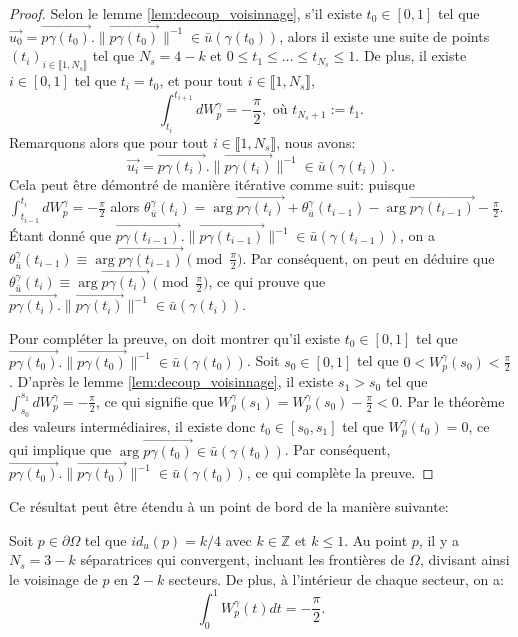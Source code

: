 \begin{proof}
Selon le lemme \ref{lem:decoup_voisinnage}, s'il existe $t_0\in[0, 1]$ tel que $\overrightarrow{u_0}=\overrightarrow{p\gamma(t_0)}.\|\overrightarrow{p\gamma(t_0)}\|^{-1}\in\bar{u}(\gamma(t_0))$, alors il existe une suite de points $(t_i)_{i\in\llbracket1, N_s\rrbracket}$ tel que $N_s=4-k$ et $0\leq t_1\leq\dots\leq t_{N_s}\leq 1$. De plus, il existe $i\in [0, 1]$ tel que $t_i=t_0$, et pour tout $i\in\llbracket 1, N_s\rrbracket$,
$$\int_{t_i}^{t_{i+1}}dW_p^\gamma=-\frac{\pi}{2},\mbox{ où }t_{N_s+1}:=t_1.$$
Remarquons alors que pour tout $i\in\llbracket 1, N_s\rrbracket$, nous avons:$$\overrightarrow{u_i}=\overrightarrow{p\gamma(t_i)}.\|\overrightarrow{p\gamma(t_i)}\|^{-1}\in\bar{u}(\gamma(t_i)).$$
Cela peut être démontré de manière itérative comme suit: puisque $\int_{t_{i-1}}^{t_{i}}dW_p^\gamma=-\frac{\pi}{2}$ alors $\theta^\gamma_{\bar{u}}(t_i)=\arg \overrightarrow{p\gamma(t_i)} +\theta^\gamma_{\bar{u}}(t_{i-1})-\arg \overrightarrow{p\gamma(t_{i-1})}-\frac{\pi}{2}$. Étant donné que $\overrightarrow{p\gamma(t_{i-1})}.\|\overrightarrow{p\gamma(t_{i-1})}\|^{-1}\in\bar{u}(\gamma(t_{i-1}))$, on a $\theta^\gamma_{\bar{u}}(t_{i-1})\equiv\arg \overrightarrow{p\gamma(t_{i-1})}\pmod{\frac{\pi}{2}}$. Par conséquent, on peut en déduire que $\theta^\gamma_{\bar{u}}(t_{i})\equiv\arg \overrightarrow{p\gamma(t_i)}\pmod{\frac{\pi}{2}}$, ce qui prouve que $\overrightarrow{p\gamma(t_i)}.\|\overrightarrow{p\gamma(t_i)}\|^{-1}\in\bar{u}(\gamma(t_i))$.

Pour compléter la preuve, on doit montrer qu'il existe $t_0\in[0,1]$ tel que $\overrightarrow{p\gamma(t_0)}.\|\overrightarrow{p\gamma(t_0)}\|^{-1}\in\bar{u}(\gamma(t_0))$. Soit $s_0\in[0,1]$ tel que $0<W_p^\gamma(s_0)<\frac{\pi}{2}$. D'après le lemme \ref{lem:decoup_voisinnage}, il existe $s_1>s_0$ tel que $\int_{s_0}^{s_1}dW_p^\gamma=-\frac{\pi}{2}$, ce qui signifie que $W_p^\gamma(s_1)=W_p^\gamma(s_0)-\frac{\pi}{2}<0$. Par le théorème des valeurs intermédiaires, il existe donc $t_0\in[s_0, s_1]$ tel que $W_p^\gamma(t_0)=0$, ce qui implique que $\arg\overrightarrow{p\gamma(t_0)}\in\bar{u}(\gamma(t_0))$. Par conséquent, $\overrightarrow{p\gamma(t_0)}.\|\overrightarrow{p\gamma(t_0)}\|^{-1}\in\bar{u}(\gamma(t_0))$, ce qui complète la preuve.
\end{proof}

Ce résultat peut être étendu à un point de bord de la manière suivante:

\begin{proposition}
\label{prop:align_sepa_voisinnage_bord}
Soit $p\in\partial\Omega$ tel que $id_u(p)=k/4$ avec $k\in\mathbb{Z}$ et $k\leq 1$. Au point $p$, il y a $N_s=3-k$ séparatrices qui convergent, incluant les frontières de $\Omega$, divisant ainsi le voisinage de $p$ en $2-k$ secteurs. De plus, à l'intérieur de chaque secteur, on a:
$$\int_0^1W_p^\gamma(t)dt=-\frac{\pi}{2}.$$
\end{proposition}

